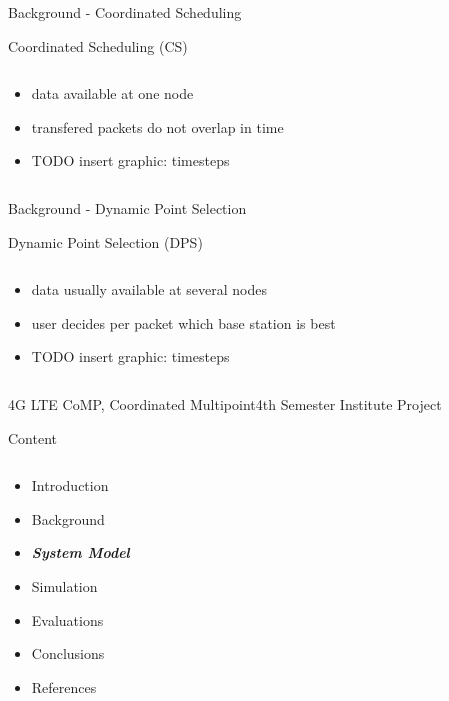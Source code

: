 \documentclass[xcolor={cmyk}]{beamer}
\begin{document}
 \begin{frame}{Background - Coordinated Scheduling}
 	\begin{block}{Coordinated Scheduling (CS)}
		\begin{columns}
			\begin{column}{.9\textwidth}
				\begin{itemize}
					\item data available at one node
					\item transfered packets do not overlap in time
					\item TODO insert graphic: timesteps
				\end{itemize}
			\end{column}
		\end{columns}
	 \end{block}
 \end{frame}

 \begin{frame}{Background - Dynamic Point Selection}
 	\begin{block}{Dynamic Point Selection (DPS)}
		\begin{columns}
			\begin{column}{.9\textwidth}
				\begin{itemize}
					\item data usually available at several nodes
					\item user decides per packet which base station is best
					\item TODO insert graphic: timesteps
				\end{itemize}
			\end{column}
		\end{columns}
	 \end{block}
 \end{frame}
 
\begin{frame}{4G LTE CoMP, Coordinated Multipoint}{4th Semester Institute Project}
	\begin{block}{Content}
		\begin{columns}
			\begin{column}{.9\textwidth}
				\begin{itemize}
					\item Introduction
					\item Background
					\item \textbf{\emph{System Model}}
					\item Simulation
					\item Evaluations
					\item Conclusions
					\item References
				\end{itemize}
			\end{column}
		\end{columns}
	\end{block}
\end{frame}
\end{document}
